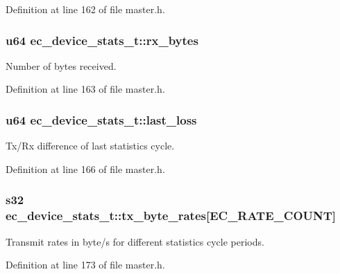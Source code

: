 Definition at line 162 of file master.\-h.

\subsubsection[{rx\-\_\-bytes}]{\setlength{\rightskip}{0pt plus 5cm}u64 ec\-\_\-device\-\_\-stats\-\_\-t\-::rx\-\_\-bytes}\label{structec__device__stats__t_a7aa4d7f1b8804dfd50d0b6caef15de9f}


Number of bytes received. 



Definition at line 163 of file master.\-h.

\subsubsection[{last\-\_\-loss}]{\setlength{\rightskip}{0pt plus 5cm}u64 ec\-\_\-device\-\_\-stats\-\_\-t\-::last\-\_\-loss}\label{structec__device__stats__t_a9cb31cea1af324f2a46ece82690027c7}


Tx/\-Rx difference of last statistics cycle. 



Definition at line 166 of file master.\-h.

\subsubsection[{tx\-\_\-byte\-\_\-rates}]{\setlength{\rightskip}{0pt plus 5cm}s32 ec\-\_\-device\-\_\-stats\-\_\-t\-::tx\-\_\-byte\-\_\-rates[{\bf E\-C\-\_\-\-R\-A\-T\-E\-\_\-\-C\-O\-U\-N\-T}]}\label{structec__device__stats__t_ac12aa6100b6c79d8c25f38d6c163bd3e}


Transmit rates in byte/s for different statistics cycle periods. 



Definition at line 173 of file master.\-h.

